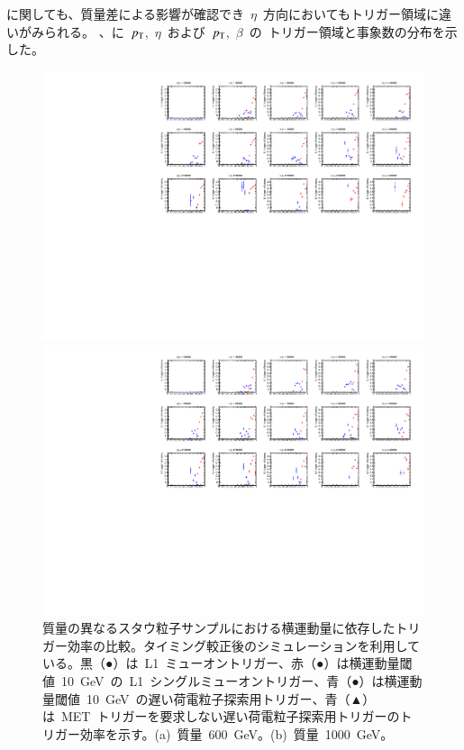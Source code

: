 に関しても、質量差による影響が確認でき~$\eta$~方向においてもトリガー領域に違いがみられる。
、に~$p_{\rm{T}}$,~$\eta$~および~$p_{\rm{T}}$,~$\beta$~の~トリガー領域と事象数の分布を示した。
\begin{figure}[H]
    \begin{minipage}{0.49\hsize}
    \centering   
    \includegraphics[width=\textwidth,page=4]{img/rec/stau_600.pdf}
    \subcaption{}
    \end{minipage}
    \begin{minipage}{0.49\hsize}
    \centering   
    \includegraphics[width=\textwidth,page=4]{img/rec/stau_1000.pdf}
    \subcaption{}
    \end{minipage}
    \caption[質量の異なるスタウ粒子サンプルにおける横運動量に依存したトリガー効率の比較]{質量の異なるスタウ粒子サンプルにおける横運動量に依存したトリガー効率の比較。タイミング較正後のシミュレーションを利用している。黒（●）は~L1~ミューオントリガー、赤（●）は横運動量閾値~10~GeV~の~L1~シングルミューオントリガー、青（●）は横運動量閾値~10~GeV~の遅い荷電粒子探索用トリガー、青（▲）は~MET~トリガーを要求しない遅い荷電粒子探索用トリガーのトリガー効率を示す。(a)~質量~600~GeV。(b)~質量~1000~GeV。}\label{fig:tript6}
\end{figure}
